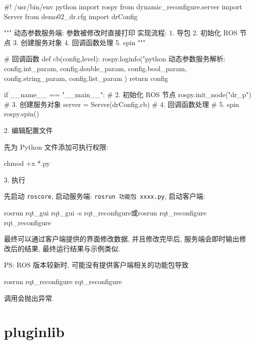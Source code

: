 \documentclass[openany, fontset=windowsold]{ctexbook}
\theoremstyle{kaiti}
\theoremstyle{normal}
\begin{document}
\begin{python}
  #! /usr/bin/env python
  import rospy
  from dynamic_reconfigure.server import Server
  from demo02_dr.cfg import drConfig

  """
      动态参数服务端: 参数被修改时直接打印
      实现流程:
          1. 导包
          2. 初始化 ROS 节点
          3. 创建服务对象
          4. 回调函数处理
          5. spin
  """

  # 回调函数
  def cb(config,level):
      rospy.loginfo("python 动态参数服务解析:%
              config.int_param,
              config.double_param,
              config.bool_param,
              config.string_param,
              config.list_param
      )
      return config

  if __name__ == "__main__":
      # 2. 初始化 ROS 节点
      rospy.init_node("dr_p")
      # 3. 创建服务对象
      server = Server(drConfig,cb)
      # 4. 回调函数处理
      # 5. spin
      rospy.spin()
\end{python}

2. 编辑配置文件

先为 Python 文件添加可执行权限:

\begin{bash}
  chmod +x *.py
\end{bash}


3. 执行

先启动 \verb|roscore|, 启动服务端: \verb|rosrun 功能包 xxxx.py|, 启动客户端:

\begin{bash}
  rosrun rqt_gui rqt_gui -s rqt_reconfigure或rosrun rqt_reconfigure rqt_reconfigure
\end{bash}

最终可以通过客户端提供的界面修改数据, 并且修改完毕后, 服务端会即时输出修改后的结果, 最终运行结果与示例类似.

PS: ROS 版本较新时, 可能没有提供客户端相关的功能包导致

\begin{bash}
  rosrun rqt_reconfigure rqt_reconfigure
\end{bash}

调用会抛出异常.

\section{pluginlib}
\end{document}
